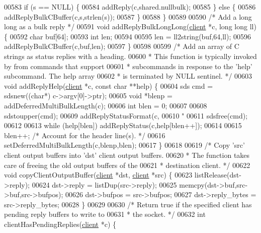 \begin{DoxyCode}
{{{00583     \textcolor{keywordflow}{if} (s == NULL) \{
00584         addReply(c,shared.nullbulk);
00585     \} \textcolor{keywordflow}{else} \{
00586         addReplyBulkCBuffer(c,s,strlen(s));
00587     \}
00588 \}
00589 
00590 \textcolor{comment}{/* Add a long long as a bulk reply */}
00591 \textcolor{keywordtype}{void} addReplyBulkLongLong(\hyperlink{structclient}{client} *c, \textcolor{keywordtype}{long} \textcolor{keywordtype}{long} ll) \{
00592     \textcolor{keywordtype}{char} buf[64];
00593     \textcolor{keywordtype}{int} len;
00594 
00595     len = ll2string(buf,64,ll);
00596     addReplyBulkCBuffer(c,buf,len);
00597 \}
00598 
00599 \textcolor{comment}{/* Add an array of C strings as status replies with a heading.}
00600 \textcolor{comment}{ * This function is typically invoked by from commands that support}
00601 \textcolor{comment}{ * subcommands in response to the 'help' subcommand. The help array}
00602 \textcolor{comment}{ * is terminated by NULL sentinel. */}
00603 \textcolor{keywordtype}{void} addReplyHelp(\hyperlink{structclient}{client} *c, \textcolor{keyword}{const} \textcolor{keywordtype}{char} **help) \{
00604     sds cmd = sdsnew((\textcolor{keywordtype}{char}*) c->argv[0]->ptr);
00605     \textcolor{keywordtype}{void} *blenp = addDeferredMultiBulkLength(c);
00606     \textcolor{keywordtype}{int} blen = 0;
00607 
00608     sdstoupper(cmd);
00609     addReplyStatusFormat(c,
00610         \textcolor{stringliteral}{"%
00611     sdsfree(cmd);
00612 
00613     \textcolor{keywordflow}{while} (help[blen]) addReplyStatus(c,help[blen++]);
00614 
00615     blen++;  \textcolor{comment}{/* Account for the header line(s). */}
00616     setDeferredMultiBulkLength(c,blenp,blen);
00617 \}
00618 
00619 \textcolor{comment}{/* Copy 'src' client output buffers into 'dst' client output buffers.}
00620 \textcolor{comment}{ * The function takes care of freeing the old output buffers of the}
00621 \textcolor{comment}{ * destination client. */}
00622 \textcolor{keywordtype}{void} copyClientOutputBuffer(\hyperlink{structclient}{client} *dst, \hyperlink{structclient}{client} *src) \{
00623     listRelease(dst->reply);
00624     dst->reply = listDup(src->reply);
00625     memcpy(dst->buf,src->buf,src->bufpos);
00626     dst->bufpos = src->bufpos;
00627     dst->reply\_bytes = src->reply\_bytes;
00628 \}
00629 
00630 \textcolor{comment}{/* Return true if the specified client has pending reply buffers to write to}
00631 \textcolor{comment}{ * the socket. */}
00632 \textcolor{keywordtype}{int} clientHasPendingReplies(\hyperlink{structclient}{client} *c) \{
}}}}
\end{DoxyCode}
